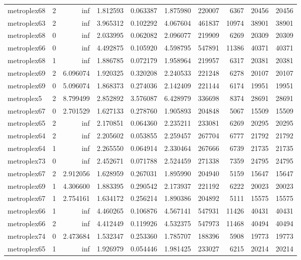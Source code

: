 \begin{longtable}{|l|r|r|r|r|r|r|r|r|r|}
metroplex68 & 2 & inf & 1.812593 & 0.063387 & 1.875980 & 220007 & 6367 & 20456 & 20456 \\
metroplex63 & 2 & inf & 3.965312 & 0.102292 & 4.067604 & 461837 & 10974 & 38901 & 38901 \\
metroplex68 & 0 & inf & 2.033995 & 0.062082 & 2.096077 & 219909 & 6269 & 20309 & 20309 \\
metroplex66 & 0 & inf & 4.492875 & 0.105920 & 4.598795 & 547891 & 11386 & 40371 & 40371 \\
metroplex68 & 1 & inf & 1.886785 & 0.072179 & 1.958964 & 219957 & 6317 & 20381 & 20381 \\
metroplex69 & 2 & 6.096074 & 1.920325 & 0.320208 & 2.240533 & 221248 & 6278 & 20107 & 20107 \\
metroplex69 & 0 & 5.096074 & 1.868373 & 0.274036 & 2.142409 & 221144 & 6174 & 19951 & 19951 \\
metroplex5 & 2 & 8.799499 & 2.852892 & 3.576087 & 6.428979 & 336698 & 8374 & 28691 & 28691 \\
metroplex67 & 0 & 2.701529 & 1.627133 & 0.278760 & 1.905893 & 204848 & 5067 & 15509 & 15509 \\
metroplex65 & 2 & inf & 2.170851 & 0.064360 & 2.235211 & 233081 & 6269 & 20295 & 20295 \\
metroplex64 & 2 & inf & 2.205602 & 0.053855 & 2.259457 & 267704 & 6777 & 21792 & 21792 \\
metroplex64 & 1 & inf & 2.265550 & 0.064914 & 2.330464 & 267666 & 6739 & 21735 & 21735 \\
metroplex73 & 0 & inf & 2.452671 & 0.071788 & 2.524459 & 271338 & 7359 & 24795 & 24795 \\
metroplex67 & 2 & 2.912056 & 1.628959 & 0.267031 & 1.895990 & 204940 & 5159 & 15647 & 15647 \\
metroplex69 & 1 & 4.306600 & 1.883395 & 0.290542 & 2.173937 & 221192 & 6222 & 20023 & 20023 \\
metroplex67 & 1 & 2.754161 & 1.634172 & 0.256214 & 1.890386 & 204892 & 5111 & 15575 & 15575 \\
metroplex66 & 1 & inf & 4.460265 & 0.106876 & 4.567141 & 547931 & 11426 & 40431 & 40431 \\
metroplex66 & 2 & inf & 4.412449 & 0.119926 & 4.532375 & 547973 & 11468 & 40494 & 40494 \\
metroplex74 & 0 & 2.473684 & 1.532347 & 0.253360 & 1.785707 & 188396 & 5908 & 19773 & 19773 \\
metroplex65 & 1 & inf & 1.926979 & 0.054446 & 1.981425 & 233027 & 6215 & 20214 & 20214 \\

\end{longtable}
